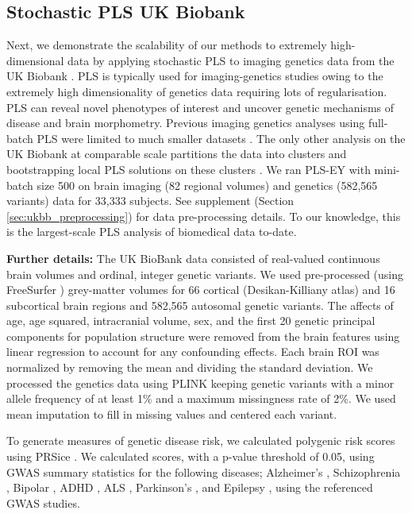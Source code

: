 \subsection{Stochastic PLS UK Biobank}
Next, we demonstrate the scalability of our methods to extremely high-dimensional data by applying stochastic PLS to imaging genetics data from the UK Biobank \citep{sudlow2015uk}.
PLS is typically used for imaging-genetics studies owing to the extremely high dimensionality of genetics data requiring lots of regularisation.
PLS can reveal novel phenotypes of interest and uncover genetic mechanisms of disease and brain morphometry.
Previous imaging genetics analyses using full-batch PLS were limited to much smaller datasets \citep{Lorenzi2018,Taquet2021,Lefloch2012}.
The only other analysis on the UK Biobank at comparable scale partitions the data into clusters and bootstrapping local PLS solutions on these clusters \citep{lorenzi2017secure, altmann2023tackling}.
We ran PLS-EY with mini-batch size 500 on brain imaging (82 regional volumes) and genetics (582,565 variants) data for 33,333 subjects. See supplement (Section \ref{sec:ukbb_preprocessing}) for data pre-processing details.
To our knowledge, this is the largest-scale PLS analysis of biomedical data to-date.

\textbf{Further details:} The UK BioBank data consisted of real-valued continuous brain volumes and ordinal, integer genetic variants.
We used pre-processed (using FreeSurfer \citep{Fischl2012}) grey-matter volumes for 66 cortical (Desikan-Killiany atlas) and 16 subcortical brain regions and 582,565 autosomal genetic variants.
The affects of age, age squared, intracranial volume, sex, and the first 20 genetic principal components for population structure were removed from the brain features using linear regression to account for any confounding effects.
Each brain ROI was normalized by removing the mean and dividing the standard deviation.
We processed the genetics data using PLINK \citep{Purcell2007} keeping genetic variants with a minor allele frequency of at least 1\%  and a maximum missingness rate of 2\%.
We used mean imputation to fill in missing values and centered each variant.

To generate measures of genetic disease risk, we calculated polygenic risk scores using PRSice \citep{PRSice2014}. We calculated scores, with a p-value threshold of 0.05, using GWAS summary statistics for the following diseases; Alzheimer's \citep{Lambert2013}, Schizophrenia \citep{Trubetskoy2022}, Bipolar \citep{Mullins2021}, ADHD \citep{Demontis2023}, ALS \citep{Van_Rheenen2021}, Parkinson's \citep{Nalls2019}, and Epilepsy \citep{International_League_Against_Epilepsy_Consortium_on_Complex_Epilepsies2018}, using the referenced GWAS studies.

